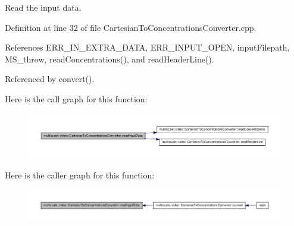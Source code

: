 \-Read the input data. 



\-Definition at line 32 of file \-Cartesian\-To\-Concentrations\-Converter.\-cpp.



\-References \-E\-R\-R\-\_\-\-I\-N\-\_\-\-E\-X\-T\-R\-A\-\_\-\-D\-A\-T\-A, \-E\-R\-R\-\_\-\-I\-N\-P\-U\-T\-\_\-\-O\-P\-E\-N, input\-Filepath, \-M\-S\-\_\-throw, read\-Concentrations(), and read\-Header\-Line().



\-Referenced by convert().



\-Here is the call graph for this function\-:
\nopagebreak
\begin{figure}[H]
\begin{center}
\leavevmode
\includegraphics[width=350pt]{classmultiscale_1_1video_1_1CartesianToConcentrationsConverter_a94094cdeaf0f48164911188709dc0e2f_cgraph}
\end{center}
\end{figure}




\-Here is the caller graph for this function\-:
\nopagebreak
\begin{figure}[H]
\begin{center}
\leavevmode
\includegraphics[width=350pt]{classmultiscale_1_1video_1_1CartesianToConcentrationsConverter_a94094cdeaf0f48164911188709dc0e2f_icgraph}
\end{center}
\end{figure}




